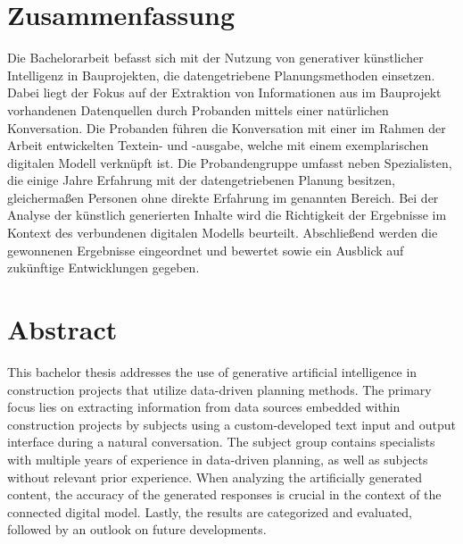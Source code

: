 \chapter*{\textbf{Zusammenfassung}}
\label{chap:abstract-german}
Die Bachelorarbeit befasst sich mit der Nutzung von generativer künstlicher Intelligenz in Bauprojekten, die datengetriebene Planungsmethoden einsetzen.
Dabei liegt der Fokus auf der Extraktion von Informationen aus im Bauprojekt vorhandenen Datenquellen durch Probanden mittels einer natürlichen Konversation. 
Die Probanden führen die Konversation mit einer im Rahmen der Arbeit entwickelten Textein- und -ausgabe, welche mit einem exemplarischen digitalen Modell verknüpft ist.
Die Probandengruppe umfasst neben Spezialisten, die einige Jahre Erfahrung mit der datengetriebenen Planung besitzen, gleichermaßen Personen ohne direkte Erfahrung im genannten Bereich. 
Bei der Analyse der künstlich generierten Inhalte wird die Richtigkeit der Ergebnisse im Kontext des verbundenen digitalen Modells beurteilt.
Abschließend werden die gewonnenen Ergebnisse eingeordnet und bewertet sowie ein Ausblick auf zukünftige Entwicklungen gegeben.


\chapter*{\textbf{Abstract}}
\label{chap:abstract-english}
This bachelor thesis addresses the use of generative artificial intelligence in construction projects that utilize data-driven planning methods.
The primary focus lies on extracting information from data sources embedded within construction projects by subjects using a custom-developed text input and output interface during a natural conversation.
The subject group contains specialists with multiple years of experience in data-driven planning, as well as subjects without relevant prior experience.
When analyzing the artificially generated content, the accuracy of the generated responses is crucial in the context of the connected digital model.
Lastly, the results are categorized and evaluated, followed by an outlook on future developments.
